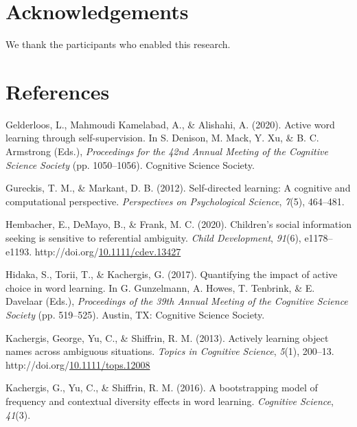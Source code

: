 \documentclass[10pt, letterpaper]{article}
\newenvironment{CSLReferences}%
  {}%
  {\par}
\begin{document}
\section{Acknowledgements}\label{acknowledgements}

We thank the participants who enabled this research.

\section{References}\label{references}

\setlength{\parindent}{-0.1in}
\setlength{\leftskip}{0.125in}

\noindent

\label{refs}
\begin{CSLReferences}
Gelderloos, L., Mahmoudi Kamelabad, A., \& Alishahi, A. (2020). Active
word learning through self-supervision. In S. Denison, M. Mack, Y. Xu,
\& B. C. Armstrong (Eds.), \emph{Proceedings for the 42nd {Annual}
{Meeting} of the {Cognitive} {Science} {Society}} (pp. 1050--1056).
Cognitive Science Society.

Gureckis, T. M., \& Markant, D. B. (2012). Self-directed learning: A
cognitive and computational perspective. \emph{Perspectives on
Psychological Science}, \emph{7}(5), 464--481.

Hembacher, E., DeMayo, B., \& Frank, M. C. (2020). Children's social
information seeking is sensitive to referential ambiguity. \emph{Child
Development}, \emph{91}(6), e1178--e1193.
http://doi.org/\href{https://doi.org/10.1111/cdev.13427}{10.1111/cdev.13427}

Hidaka, S., Torii, T., \& Kachergis, G. (2017). Quantifying the impact
of active choice in word learning. In G. Gunzelmann, A. Howes, T.
Tenbrink, \& E. Davelaar (Eds.), \emph{Proceedings of the 39th {Annual}
{Meeting} of the {Cognitive} {Science} {Society}} (pp. 519--525).
Austin, TX: Cognitive Science Society.

Kachergis, George, Yu, C., \& Shiffrin, R. M. (2013). Actively learning
object names across ambiguous situations. \emph{Topics in Cognitive
Science}, \emph{5}(1), 200--13.
http://doi.org/\href{https://doi.org/10.1111/tops.12008}{10.1111/tops.12008}

Kachergis, G., Yu, C., \& Shiffrin, R. M. (2016). A bootstrapping model
of frequency and contextual diversity effects in word learning.
\emph{Cognitive Science}, \emph{41}(3).


\end{CSLReferences}
\end{document}
